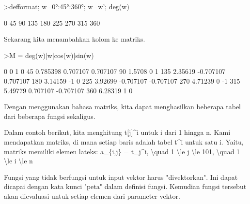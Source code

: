 \documentclass{article}
\begin{document}
\begin{eulernotebook}
\begin{eulercomment}
\begin{eulercomment}
\begin{eulercomment}
\begin{eulercomment}
\begin{eulerprompt}
>defformat; w=0°:45°:360°; w=w'; deg(w)
\end{eulerprompt}
\begin{euleroutput}
              0 
             45 
             90 
            135 
            180 
            225 
            270 
            315 
            360 
\end{euleroutput}
\begin{eulercomment}
Sekarang kita menambahkan kolom ke matriks.
\end{eulercomment}
\begin{eulerprompt}
>M = deg(w)|w|cos(w)|sin(w)
\end{eulerprompt}
\begin{euleroutput}
              0             0             1             0 
             45      0.785398      0.707107      0.707107 
             90        1.5708             0             1 
            135       2.35619     -0.707107      0.707107 
            180       3.14159            -1             0 
            225       3.92699     -0.707107     -0.707107 
            270       4.71239             0            -1 
            315       5.49779      0.707107     -0.707107 
            360       6.28319             1             0 
\end{euleroutput}
\begin{eulercomment}
Dengan menggunakan bahasa matriks, kita dapat menghasilkan beberapa
tabel dari beberapa fungsi sekaligus.

Dalam contoh berikut, kita menghitung t[j]\textasciicircum{}i untuk i dari 1 hingga n.
Kami mendapatkan matriks, di mana setiap baris adalah tabel t\textasciicircum{}i untuk
satu i. Yaitu, matriks memiliki elemen lateks: a\_\{i,j\} = t\_j\textasciicircum{}i, \textbackslash{}quad
1 \textbackslash{}le j \textbackslash{}le 101, \textbackslash{}quad 1 \textbackslash{}le i \textbackslash{}le n

Fungsi yang tidak berfungsi untuk input vektor harus "divektorkan".
Ini dapat dicapai dengan kata kunci "peta" dalam definisi fungsi.
Kemudian fungsi tersebut akan dievaluasi untuk setiap elemen dari
parameter vektor.


\end{eulercomment}
\end{eulercomment}
\end{eulercomment}
\end{eulercomment}
\end{eulercomment}
\end{eulernotebook}
\end{document}
